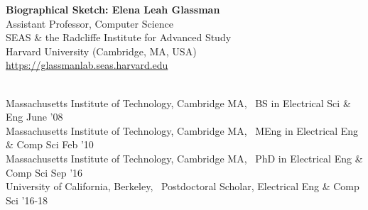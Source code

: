 \documentclass[11pt]{article}
\begin{document}
\begin{center}
\large
\textbf{Biographical Sketch: Elena Leah Glassman}\\
\vspace{0.05\spc}
\normalsize
Assistant Professor, Computer Science\\
SEAS \& the Radcliffe Institute for Advanced Study\\
Harvard University (Cambridge, MA, USA)\\
\small{\url{https://glassmanlab.seas.harvard.edu}}
\end{center}


\\
Massachusetts Institute of Technology, Cambridge MA, \ BS in Electrical Sci \& Eng \hfill June '08\\
Massachusetts Institute of Technology, Cambridge MA, \ MEng in Electrical Eng \& Comp Sci \hfill Feb '10\\
Massachusetts Institute of Technology, Cambridge MA, \ PhD in Electrical Eng \& Comp Sci \hfill Sep '16\\
University of California, Berkeley, \ Postdoctoral Scholar, Electrical Eng \& Comp Sci \hfill '16-18
\end{document}
